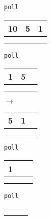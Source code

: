 \documentclass[iutinfo,10pt]{ustl-tdtp}
\begin{document}
\texttt{poll}\\
\begin{tabular}{|c|c|c|}
\hline
    10 & 5 & 1 \\
\hline
     &  &  \\
\hline
     &  &  \\
\hline
\end{tabular}

\texttt{poll}\\
\begin{tabular}{|c|c|c|}
\hline
    1 & 5 &  \\
\hline
     &  &  \\
\hline
     &  &  \\
\hline
\end{tabular}
$\rightarrow$
\begin{tabular}{|c|c|c|}
\hline
    5 & 1 & \\
\hline
     &  &  \\
\hline
     &  &  \\
\hline
\end{tabular}

\texttt{poll}\\
\begin{tabular}{|c|c|c|}
\hline
    1 & &  \\
\hline
     &  &  \\
\hline
     &  &  \\
\hline
\end{tabular}

\texttt{poll}\\
\begin{tabular}{|c|c|c|}
\hline
     & &  \\
\hline
     &  &  \\
\hline
     &  &  \\
\hline
\end{tabular}
\end{document}
